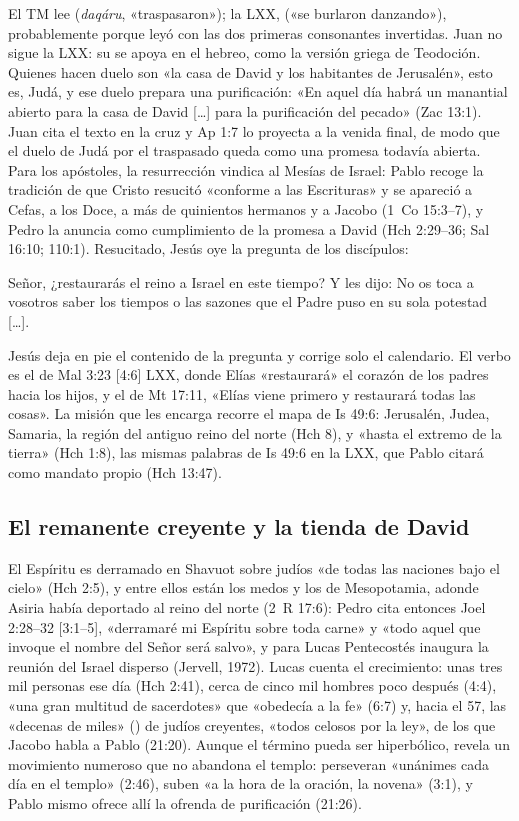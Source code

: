 El TM lee  (\emph{daqáru}, «traspasaron»); la LXX,  («se burlaron danzando»), probablemente porque leyó  con las dos primeras consonantes invertidas. Juan no sigue la LXX: su  se apoya en el hebreo, como la versión griega de Teodoción. Quienes hacen duelo son «la casa de David y los habitantes de Jerusalén», esto es, Judá, y ese duelo prepara una purificación: «En aquel día habrá un manantial abierto para la casa de David [\ldots] para la purificación del pecado» (Zac 13:1). Juan cita el texto en la cruz y Ap 1:7 lo proyecta a la venida final, de modo que el duelo de Judá por el traspasado queda como una promesa todavía abierta. Para los apóstoles, la resurrección vindica al Mesías de Israel: Pablo recoge la tradición de que Cristo resucitó «conforme a las Escrituras» y se apareció a Cefas, a los Doce, a más de quinientos hermanos y a Jacobo (1~Co 15:3--7), y Pedro la anuncia como cumplimiento de la promesa a David (Hch 2:29--36; Sal 16:10; 110:1). Resucitado, Jesús oye la pregunta de los discípulos:

\begin{cita}Señor, ¿restaurarás el reino a Israel en este tiempo? Y les dijo: No os toca a vosotros saber los tiempos o las sazones que el Padre puso en su sola potestad [\ldots].\end{cita}

Jesús deja en pie el contenido de la pregunta y corrige solo el calendario. El verbo  es el de Mal 3:23 [4:6] LXX, donde Elías «restaurará» el corazón de los padres hacia los hijos, y el de Mt 17:11, «Elías viene primero y restaurará todas las cosas». La misión que les encarga recorre el mapa de Is 49:6: Jerusalén, Judea, Samaria, la región del antiguo reino del norte (Hch 8), y «hasta el extremo de la tierra» (Hch 1:8), las mismas palabras de Is 49:6 en la LXX, que Pablo citará como mandato propio (Hch 13:47).

\subsection{El remanente creyente y la tienda de David}
El Espíritu es derramado en Shavuot sobre judíos «de todas las naciones bajo el cielo» (Hch 2:5), y entre ellos están los medos y los de Mesopotamia, adonde Asiria había deportado al reino del norte (2~R 17:6): Pedro cita entonces Joel 2:28--32 [3:1--5], «derramaré mi Espíritu sobre toda carne» y «todo aquel que invoque el nombre del Señor será salvo», y para Lucas Pentecostés inaugura la reunión del Israel disperso (Jervell, 1972). Lucas cuenta el crecimiento: unas tres mil personas ese día (Hch 2:41), cerca de cinco mil hombres poco después (4:4), «una gran multitud de sacerdotes» que «obedecía a la fe» (6:7) y, hacia el 57, las «decenas de miles» () de judíos creyentes, «todos celosos por la ley», de los que Jacobo habla a Pablo (21:20). Aunque el término pueda ser hiperbólico, revela un movimiento numeroso que no abandona el templo: perseveran «unánimes cada día en el templo» (2:46), suben «a la hora de la oración, la novena» (3:1), y Pablo mismo ofrece allí la ofrenda de purificación (21:26).

